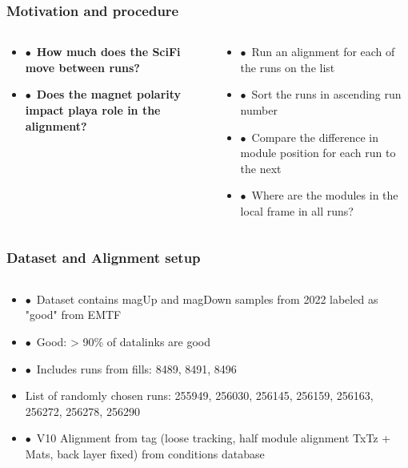 \documentclass[aspectratio=1610, 12pt, xcolor=dvipsnames]{beamer}
\begin{document}
\begin{frame}\frametitle{Motivation and procedure}
  \begin{columns}
    \begin{column}[c]{0.4\textwidth}
      \begin{itemize}
        \setlength\itemsep{1em}
        \item $\bullet$\, \textbf{How much does the SciFi move between runs?}
        \item $\bullet$\, \textbf{Does the magnet polarity impact playa role in the alignment?}
      \end{itemize}
    \end{column}
    \begin{column}[c]{0.6\textwidth}
      \begin{itemize}
        \item $\bullet$\, Run an alignment for each of the runs on the list
        \item $\bullet$\, Sort the runs in ascending run number
        \item $\bullet$\, Compare the difference in module position for each run to the next
        \item $\bullet$\, Where are the modules in the local frame in all runs?
      \end{itemize}
    \end{column}
  \end{columns}
\end{frame}

\begin{frame}\frametitle{Dataset and Alignment setup}
  \begin{columns}
    \begin{column}[c]{0.9\textwidth}
      \begin{itemize}
        \setlength\itemsep{0em}
        \item $\bullet$\, Dataset contains magUp and magDown samples from 2022 labeled as "good" from EMTF
        \item $\bullet$\, Good: > 90\% of datalinks are good
        \item $\bullet$\, Includes runs from fills: 8489, 8491, 8496
        \item List of randomly chosen runs: 255949, 256030, 256145, 256159, 256163, 256272, 256278, 256290
        \item $\bullet$\, V10 Alignment from tag (loose tracking, half module alignment TxTz + Mats, back layer fixed) from conditions database
      \end{itemize}
    \end{column}
  \end{columns}
\end{frame}
\end{document}

